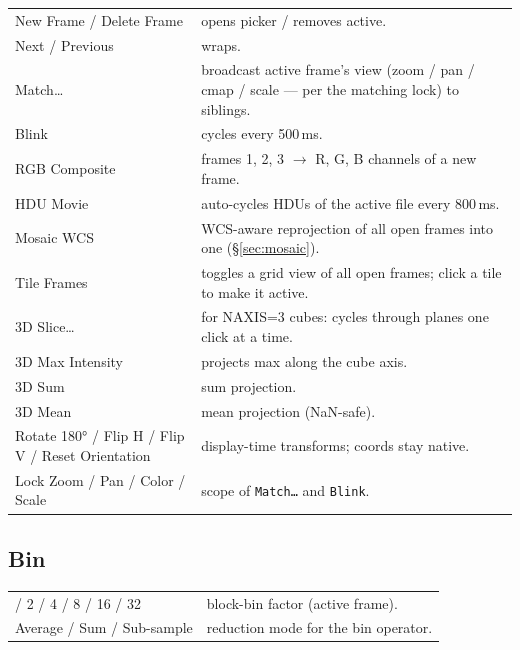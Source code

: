 \documentclass[11pt,a4paper]{article}
\begin{document}
\begin{tabular}{@{}>{\sffamily}lp{}@{}}
\toprule
New Frame / Delete Frame & opens picker / removes active. \\
Next / Previous          & wraps. \\
Match\dots               & broadcast active frame's view (zoom / pan /
                            cmap / scale --- per the matching lock) to
                            siblings. \\
Blink                    & cycles every 500\,ms. \\
RGB Composite            & frames 1, 2, 3 $\to$ R, G, B channels of a new
                            frame. \\
HDU Movie                & auto-cycles HDUs of the active file every 800\,ms. \\
Mosaic WCS               & WCS-aware reprojection of all open frames into
                            one (\S\ref{sec:mosaic}). \\
Tile Frames              & toggles a grid view of all open frames; click a
                            tile to make it active. \\
3D Slice\dots            & for NAXIS=3 cubes: cycles through planes one
                            click at a time. \\
3D Max Intensity         & projects max along the cube axis. \\
3D Sum                   & sum projection. \\
3D Mean                  & mean projection (NaN-safe). \\
Rotate 180° / Flip H / Flip V / Reset Orientation & display-time
                            transforms; coords stay native. \\
Lock Zoom / Pan / Color / Scale & scope of \texttt{Match\dots} and
                            \texttt{Blink}. \\
\bottomrule
\end{tabular}

\subsection{Bin}

\begin{tabular}{@{}>{\sffamily}lp{}@{}}
\toprule
1 / 2 / 4 / 8 / 16 / 32        & block-bin factor (active frame). \\
Average / Sum / Sub-sample     & reduction mode for the bin operator. \\
\bottomrule
\end{tabular}
\end{document}
